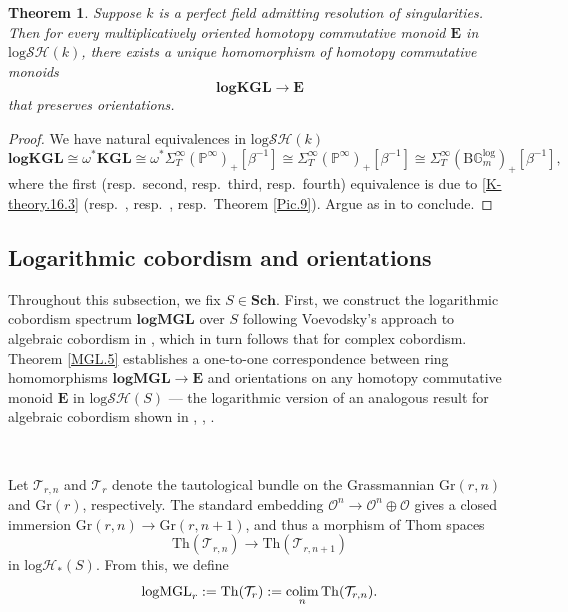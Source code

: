 \documentclass[11pt, a4paper]{amsart}
\newtheorem{thm}{Theorem}[subsection]
\theoremstyle{definition}
\numberwithin{equation}{subsection}
\renewcommand{\P}{\mathbb{P}}
\newcommand{\Sch}{\mathbf{Sch}}
\newcommand{\colimit}{\mathop{\rm colim}}
\newcommand{\Gr}{{\mathrm{Gr}}}
\newcommand{\KGL}{{\mathbf{KGL}}}
\newcommand{\Thom}{\mathrm{Th}}
\newcommand{\clspace}{\mathrm{B}}
\newcommand{\logKGL}{\mathbf{logKGL}}
\newcommand{\logMGL}{{\mathrm{logMGL}}}
\newcommand{\spectlogMGL}{{\mathbf{logMGL}}}
\newcommand{\cO}{\mathcal{O}}
\newcommand{\cT}{\mathcal{T}}
\newcommand{\bE}{\mathbf{E}}
\newcommand{\Gmm}{\mathbb{G}_m^{\mathrm{log}}}
\newcommand{\ringE}{\mathbf{E}}
\newcommand{\inflogH}{\mathrm{log}\mathcal{H}}
\newcommand{\inflogSH}{\mathrm{log}\mathcal{SH}}
\begin{document}
\begin{thm}
\label{Ori.71}
Suppose $k$ is a perfect field admitting resolution of singularities.
Then for every multiplicatively oriented homotopy commutative monoid $\bE$ in $\inflogSH(k)$,
there exists a unique homomorphism of homotopy commutative monoids
\[
\logKGL \to \bE
\]
that preserves orientations.
\end{thm}
\begin{proof}
We have natural equivalences in $\inflogSH(k)$
\[
\logKGL
\cong
\omega^*\KGL
\cong
\omega^*\Sigma_T^\infty (\P^\infty)_+[\beta^{-1}]
\cong
\Sigma_T^\infty (\P^\infty)_+[\beta^{-1}]
\cong
\Sigma_T^\infty (\clspace\Gmm)_+[\beta^{-1}],
\]
where the first (resp.\ second, resp.\ third, resp.\ fourth) equivalence is due to \eqref{K-theory.16.3} (resp.\ \cite[Lemmas 3.5--3.7]{zbMATH05549229}, resp.\ \cite[Theorem 1.1(2)]{Doosgroups}, resp.\ Theorem \ref{Pic.9}).
Argue as in \cite[Lemmas 3.5--3.7]{zbMATH05549229} to conclude.
\end{proof}




\subsection{Logarithmic cobordism and orientations}
Throughout this subsection, we fix $S\in \Sch$.
First, 
we construct the logarithmic cobordism spectrum $\spectlogMGL$ over $S$ following Voevodsky's approach to 
algebraic cobordism in \cite[\S 6.3]{zbMATH01194164}, 
which in turn follows that for complex cobordism.
Theorem \ref{MGL.5} establishes a  one-to-one correspondence between ring homomorphisms 
$\spectlogMGL\to \ringE$ and orientations on any homotopy commutative monoid $\ringE$ in $\inflogSH(S)$ 
--- the logarithmic version of an analogous result for algebraic cobordism shown in 
\cite{zbMATH01648745}, \cite{zbMATH05367298}, \cite{zbMATH02216798}.

\

Let $\cT_{r,n}$ and $\cT_r$ denote the tautological bundle on the Grassmannian $\Gr(r,n)$ and $\Gr(r)$, 
respectively.
The standard embedding $\cO^n \to \cO^n \oplus \cO$ gives a closed immersion $\Gr(r,n)\to \Gr(r,n+1)$, 
and thus a morphism of Thom spaces
\begin{equation}
\label{MGL.0.1}
\Thom(\cT_{r,n})\to \Thom(\cT_{r,n+1})
\end{equation}
in $\inflogH_{\ast}(S)$.
From this, we define \index[notation]{logMGLr @ $\logMGL_r$}
\[
\logMGL_r:=\Thom(\cT_r):=\colimit_n \Thom(\cT_{r,n}).
\]
\end{document}
